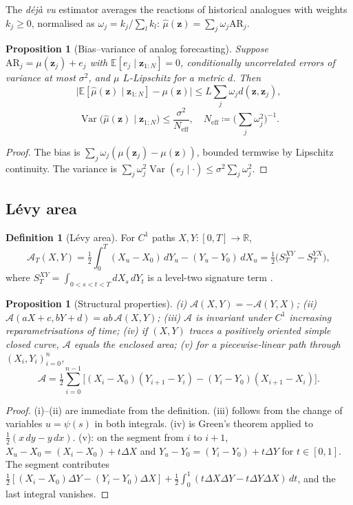 \documentclass{article}
\theoremstyle{plain}
\newtheorem{proposition}[theorem]{Proposition}
\theoremstyle{definition}
\newtheorem{definition}[theorem]{Definition}
\theoremstyle{remark}
\newcommand{\R}{\mathbb{R}}
\newcommand{\E}{\mathbb{E}}
\newcommand{\z}{\bm{z}}
\DeclareMathOperator{\Var}{Var}
\begin{document}
The \emph{d\'ej\`a vu} estimator averages the reactions of historical analogues with weights $k_j\ge0$, normalised as $\omega_j=k_j/\sum_lk_l$: $\hat\mu(\z)=\sum_j\omega_j\mathrm{AR}_j$.
\begin{proposition}[Bias--variance of analog forecasting]\label{prop:analog}
Suppose $\mathrm{AR}_j=\mu(\z_j)+e_j$ with $\E[e_j\mid\z_{1:N}]=0$, conditionally uncorrelated errors of variance at most $\sigma^2$, and $\mu$ $L$-Lipschitz for a metric $d$. Then
\[
  \big|\E[\hat\mu(\z)\mid\z_{1:N}]-\mu(\z)\big|\le L\sum_j\omega_jd(\z,\z_j),
\]
\[
  \Var\big(\hat\mu(\z)\mid\z_{1:N}\big)\le\frac{\sigma^2}{N_{\text{eff}}},\quad N_{\text{eff}}\coloneqq\Big(\sum_j\omega_j^2\Big)^{-1}.
\]
\end{proposition}
\begin{proof}
The bias is $\sum_j\omega_j(\mu(\z_j)-\mu(\z))$, bounded termwise by Lipschitz continuity. The variance is $\sum_j\omega_j^2\Var(e_j\mid\cdot)\le\sigma^2\sum_j\omega_j^2$.
\end{proof}

\subsection{L\'evy area}
\begin{definition}[L\'evy area]
For $C^1$ paths $X,Y:[0,T]\to\R$,
\[
  \mathcal{A}_T(X,Y)=\tfrac12\int_0^T(X_u-X_0)\,dY_u-(Y_u-Y_0)\,dX_u=\tfrac12\big(S^{XY}_T-S^{YX}_T\big),
\]
where $S^{XY}_T=\int_{0<s<t<T}dX_s\,dY_t$ is a level-two signature term \citep{lyons1998,chevyrev2016}.
\end{definition}
\begin{proposition}[Structural properties]\label{prop:levyprops}
(i) $\mathcal{A}(X,Y)=-\mathcal{A}(Y,X)$; (ii) $\mathcal{A}(aX+c,bY+d)=ab\,\mathcal{A}(X,Y)$; (iii) $\mathcal{A}$ is invariant under $C^1$ increasing reparametrisations of time; (iv) if $(X,Y)$ traces a positively oriented simple closed curve, $\mathcal{A}$ equals the enclosed area; (v) for a piecewise-linear path through $(X_i,Y_i)_{i=0}^n$,
\[
  \mathcal{A}=\tfrac12\sum_{i=0}^{n-1}\big[(X_i-X_0)(Y_{i+1}-Y_i)-(Y_i-Y_0)(X_{i+1}-X_i)\big].
\]
\end{proposition}
\begin{proof}
(i)--(ii) are immediate from the definition. (iii) follows from the change of variables $u=\psi(s)$ in both integrals. (iv) is Green's theorem applied to $\tfrac12(x\,dy-y\,dx)$. (v): on the segment from $i$ to $i+1$, $X_u-X_0=(X_i-X_0)+t\Delta X$ and $Y_u-Y_0=(Y_i-Y_0)+t\Delta Y$ for $t\in[0,1]$. The segment contributes $\tfrac12[(X_i-X_0)\Delta Y-(Y_i-Y_0)\Delta X]+\tfrac12\int_0^1(t\Delta X\Delta Y-t\Delta Y\Delta X)\,dt$, and the last integral vanishes.
\end{proof}
\end{document}
